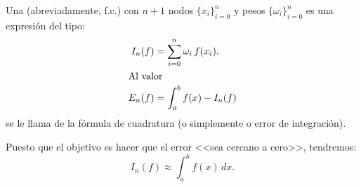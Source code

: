 \begin{definition}
  \label{def:formula-cuadratura}
  Una  (abreviadamente, f.c.) con
  $n+1$ nodos $\{x_i\}_{i=0}^n$ y pesos $\{\omega_i\}_{i=0}^n$ es una
  expresión del tipo:
  \begin{align}
    \label{eq:f.cuadratura}
    I_n(f)&=\sum_{i=0}^n \omega_i \, f(x_i).
    \\
    \intertext{Al valor}
    \notag
    E_n(f) &= \int_a^b f(x) - I_n(f)
  \end{align}
  se le llama  de la fórmula de cuadratura (o
  simplemente  o error de integración).
\end{definition}
Puesto que el objetivo es hacer que el error <<sea cercano a cero>>, tendremos:
\begin{equation*}
  I_n(f) \approx \int_a^b f(x)\, dx.
\end{equation*}


